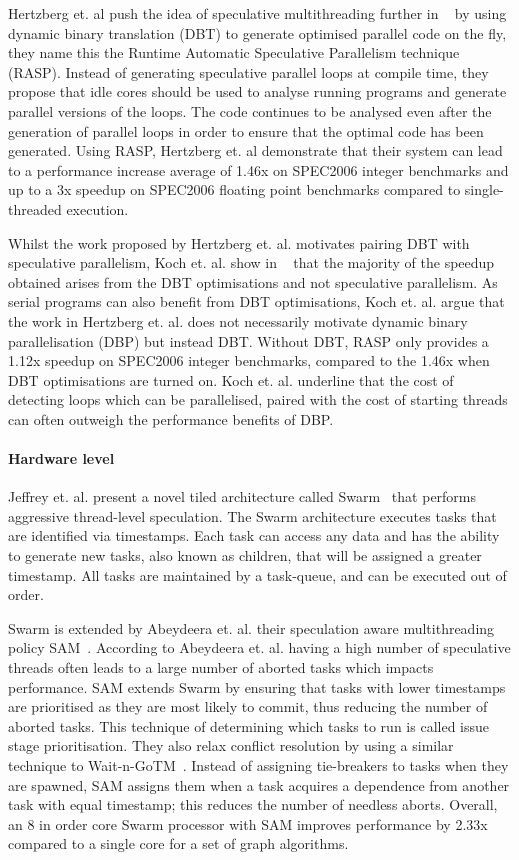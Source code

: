 Hertzberg et. al push the idea of speculative multithreading further in ~\cite{dbtspec2011} by using dynamic binary translation (DBT) to generate optimised parallel code on the fly, they name this the Runtime Automatic Speculative Parallelism technique (RASP).
Instead of generating speculative parallel loops at compile time, they propose that idle cores should be used to analyse running programs and generate parallel versions of the loops.
The code continues to be analysed even after the generation of parallel loops in order to ensure that the optimal code has been generated.
Using RASP, Hertzberg et. al demonstrate that their system can lead to a performance increase average of 1.46x on SPEC2006 integer benchmarks and up to a 3x speedup on SPEC2006 floating point benchmarks compared to single-threaded execution.

Whilst the work proposed by Hertzberg et. al. motivates pairing DBT with speculative parallelism, Koch et. al. show in ~\cite{koch2013spec} that the majority of the speedup obtained arises from the DBT optimisations and not speculative parallelism.
As serial programs can also benefit from DBT optimisations, Koch et. al. argue that the work in Hertzberg et. al. does not necessarily motivate dynamic binary parallelisation (DBP) but instead DBT.
Without DBT, RASP only provides a 1.12x speedup on SPEC2006 integer benchmarks, compared to the 1.46x when DBT optimisations are turned on.
Koch et. al. underline that the cost of detecting loops which can be parallelised, paired with the cost of starting threads can often outweigh the performance benefits of DBP.
 
\paragraph*{Hardware level}
Jeffrey et. al. present a novel tiled architecture called Swarm~\cite{swarm2016} that performs aggressive thread-level speculation.
The Swarm architecture executes tasks that are identified via timestamps.
Each task can access any data and has the ability to generate new tasks, also known as children, that will be assigned a greater timestamp.
All tasks are maintained by a task-queue, and can be executed out of order.

Swarm is extended by Abeydeera et. al. their speculation aware multithreading policy SAM~\cite{Abeydeera2017SpecMulti}.
According to Abeydeera et. al. having a high number of speculative threads often leads to a large number of aborted tasks which impacts performance.
SAM extends Swarm by ensuring that tasks with lower timestamps are prioritised as they are most likely to commit, thus reducing the number of aborted tasks.
This technique of determining which tasks to run is called issue stage prioritisation.
They also relax conflict resolution by using a similar technique to Wait-n-GoTM~\cite{waitNGo2013}.
Instead of assigning tie-breakers to tasks when they are spawned, SAM assigns them when a task acquires a dependence from another task with equal timestamp; this reduces the number of needless aborts.
Overall, an 8 in order core Swarm processor with SAM improves performance by 2.33x compared to a single core for a set of graph algorithms.

